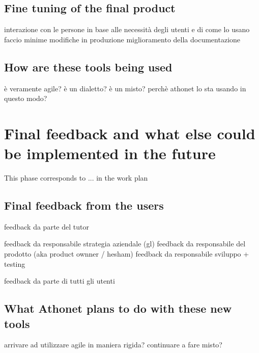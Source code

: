 	\subsection{Fine tuning of the final product}
		interazione con le persone
		in base alle necessità degli utenti e di come lo usano faccio minime modifiche in produzione
		miglioramento della documentazione
	
	\subsection{How are these tools being used}
		è veramente agile? 
		è un dialetto?
		è un misto?
		perchè athonet lo sta usando in questo modo?

\section{Final feedback and what else could be implemented in the future}

	This phase corresponds to ... in the work plan

	\subsection{Final feedback from the users}
		feedback da parte del tutor
		
		feedback da responsabile strategia aziendale (gl)
		feedback da responsabile del prodotto (aka product ownner / hesham)
		feedback da responsabile sviluppo + testing
			
		feedback da parte di tutti gli utenti
	
	\subsection{What Athonet plans to do with these new tools}
		arrivare ad utilizzare agile in maniera rigida?
		continuare a fare misto?
